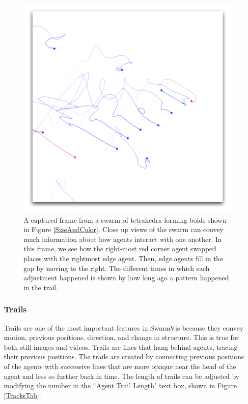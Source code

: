 \documentclass[conference]{IEEEtran}
\begin{document}
\begin{figure}
\centering
\includegraphics[scale=.5]{images/closeuptrails.pdf}
\caption{
A captured frame from a swarm of tetrahedra-forming boids shown in Figure \ref{SizeAndColor}.
Close up views of the swarm can convey much information about how agents interact with one another.
In this frame, we see how the right-most red corner agent swapped places with the rightmost edge agent.
Then, edge agents fill in the gap by moving to the right. The different times in which each adjustment happened
is shown by how long ago a pattern happened in the trail.}
\label{CloseTrails}
\end{figure}

\subsubsection{Trails}

Trails are one of the most important features in SwarmVis because they convey motion, previous positions, direction,
and change in structure. This is true for both still images and videos. Trails are lines that hang behind agents, tracing
their previous positions. 
The trails are created by connecting previous positions of the agents with
successive lines that are more opaque near the head of the agent and less so further back in time.
The length of trails can be adjusted by modifying the number in the ``Agent Trail Length" text box, shown in
Figure \ref{TracksTab}.
\end{document}
